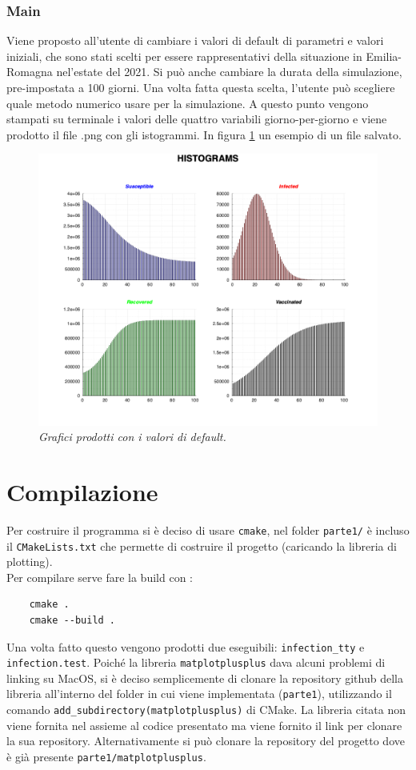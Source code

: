 \documentclass{article}
\begin{document}
{{{{\subsubsection{Main}
Viene proposto all'utente di cambiare i valori di default di 
parametri e valori iniziali, che sono stati scelti per essere 
rappresentativi della situazione in Emilia-Romagna nel'estate del 
2021. Si può anche cambiare la durata della simulazione, 
pre-impostata a 100 giorni.
Una volta fatta questa scelta, l'utente può scegliere quale metodo 
numerico usare per la simulazione. A questo punto vengono stampati 
su terminale i valori delle quattro variabili giorno-per-giorno e 
viene prodotto il file .png con gli istogrammi. In figura \ref{fig::mpp}
un esempio di un file salvato.
\begin{figure} 
    \centering
    \includegraphics[width=0.4\paperwidth]{infection.png}
    \caption{\textit{Grafici prodotti con i valori di default.}}
    \label{fig::mpp}
\end{figure}
\section{Compilazione}
\hspace{\parindent} Per costruire il programma si è deciso di usare 
\verb|cmake|, nel folder \verb|parte1/| è incluso il 
\verb|CMakeLists.txt| che permette di costruire il progetto 
(caricando la libreria di plotting).\\
Per compilare serve fare la build con :
\begin{verbatim}
    cmake .  
    cmake --build .
\end{verbatim} 
Una volta fatto questo vengono prodotti due
eseguibili: \verb|infection_tty| e \verb|infection.test|.
Poiché la libreria \verb|matplotplusplus| dava alcuni problemi di
linking su MacOS, si è deciso semplicemente di clonare la repository
github della libreria all'interno del folder in cui viene implementata 
(\verb|parte1|), 
utilizzando il comando \verb|add_subdirectory(matplotplusplus)|
di CMake. La libreria citata non viene fornita nel assieme al codice
presentato ma viene fornito il link per clonare la sua repository.
Alternativamente si può clonare la repository del progetto dove è già
presente \verb|parte1/matplotplusplus|.
}}}}
\end{document}
